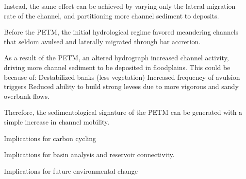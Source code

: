 \documentclass[draft]{compact_proposal}
\begin{document}
Instead, the same effect can be achieved by varying only the lateral migration rate of the channel, and partitioning more channel sediment to deposits.

Before the PETM, the initial hydrological regime favored meandering channels that seldom avulsed and laterally migrated through bar accretion.

As a result of the PETM, an altered hydrograph increased channel activity, driving more channel sediment to be deposited in floodplains. This could be because of:
    Destabilized banks (less vegetation)
    Increased frequency of avulsion triggers
    Reduced ability to build strong levees due to more vigorous and sandy overbank flows.

Therefore, the sedimentological signature of the PETM can be generated with a simple increase in channel mobility.

Implications for carbon cycling

Implications for basin analysis and reservoir connectivity.

Implications for future environmental change


\printbibliography
\end{document}

